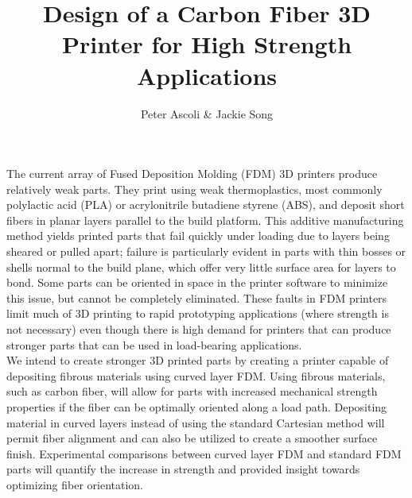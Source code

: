 \documentclass[letter,10pt,english]{article}
\begin{document}
\title{Design of a Carbon Fiber 3D Printer for High Strength Applications}
\author{Peter Ascoli \& Jackie Song}
\date{}

\maketitle

\thispagestyle{fancy}


The current array of Fused Deposition Molding (FDM) 3D printers produce relatively weak parts. They print using weak thermoplastics, most commonly polylactic acid (PLA) or acrylonitrile butadiene styrene (ABS), and deposit short fibers in planar layers parallel to the build platform. This additive manufacturing method yields printed parts that fail quickly under loading due to layers being sheared or pulled apart; failure is particularly evident in parts with thin bosses or shells normal to the build plane, which offer very little surface area for layers to bond. Some parts can be oriented in space in the printer software to minimize this issue, but cannot be completely eliminated. These faults in FDM printers limit much of 3D printing to rapid prototyping applications (where strength is not necessary) even though there is high demand for printers that can produce stronger parts that can be used in load-bearing applications.\\


We intend to create stronger 3D printed parts by creating a printer capable of depositing fibrous materials using curved layer FDM. Using fibrous materials, such as carbon fiber, will allow for parts with increased mechanical strength properties if the fiber can be optimally oriented along a load path. Depositing material in curved layers instead of using the standard Cartesian method will permit fiber alignment and can also be utilized to create a smoother surface finish. Experimental comparisons between curved layer FDM and standard FDM parts will quantify the increase in strength and provided insight towards optimizing fiber orientation.\\

\end{document}
